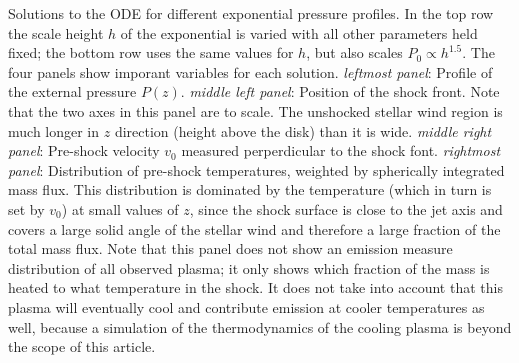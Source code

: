 \label{fig:p_ext}
Solutions to the ODE for different exponential pressure profiles. In the top row the scale height $h$ of the exponential is varied with all other parameters held fixed; the bottom row uses the same values for $h$, but also scales $P_0\propto h^{1.5}$.
The four panels show imporant variables for each solution. \emph{leftmost panel}: Profile of the external pressure $P(z)$. \emph{middle left panel}: Position of the shock front. Note that the two axes in this panel are to scale. The unshocked stellar wind region is much longer in $z$ direction (height above the disk) than it is wide. \emph{middle right panel}: Pre-shock velocity $v_0$ measured perperdicular to the shock font. \emph{rightmost panel}: Distribution of pre-shock temperatures, weighted by spherically integrated mass flux. This distribution is dominated by the temperature (which in turn is set by $v_0$) at small values of $z$, since the shock surface is close to the jet axis and covers a large solid angle of the stellar wind and therefore a large fraction of the total mass flux. Note that this panel does not show an emission measure distribution of all observed plasma; it only shows which fraction of the mass is heated to what temperature in the shock. It does not take into account that this plasma will eventually cool and contribute emission at cooler temperatures as well, because a simulation of the thermodynamics of the cooling plasma is beyond the scope of this article.